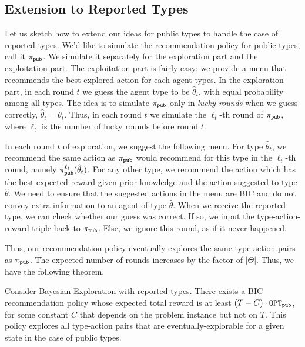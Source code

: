 
\subsection{Extension to Reported Types}
\label{sec:private_c}

\newcommand{\pipub}{\pi_{\term{pub}}}

Let us sketch how to extend our ideas for public types to handle the case of reported types. We'd like to simulate the recommendation policy for public types, call it $\pipub$. We simulate it separately for the exploration part and the exploitation part. The exploitation part is fairly easy: we provide a menu that recommends the best explored action for each agent types. In the exploration part, in each round $t$ we guess the agent type to be $\hat{\theta}_t$, with equal probability among all types. The idea is to simulate $\pipub$ only in \emph{lucky rounds} when we guess correctly, \ie $\hat{\theta}_t=\theta_t$. Thus, 
in each round $t$ we simulate the $\ell_t$-th round of $\pipub$, where $\ell_t$ is the number of lucky rounds before round $t$.

In each round $t$ of exploration, we suggest the following menu. For type $\hat{\theta}_t$, we recommend the same action as $\pipub$ would recommend for this type in the $\ell_t$-th round, namely $\pipub^{\ell_t}(\hat{\theta}_t)$.
For any other type, we recommend the action which has the best expected reward given prior knowledge and the action suggested to type $\hat{\theta}$.  We need to  ensure that the suggested actions in the menu are BIC and do not convey extra information to an agent of type $\hat{\theta}$. When we receive the reported type, we can check whether our guess was correct. If so, we input the type-action-reward triple back to $\pipub$. Else, we ignore this round, as if it never happened.

Thus, our recommendation policy eventually explores the same type-action pairs as $\pipub$. The expected number of rounds increases by the factor of $|\varTheta|$. Thus, we have the following theorem.

\begin{theorem}
\label{thm:reported}
Consider Bayesian Exploration with reported types.
There exists a BIC recommendation policy whose expected total reward is at least $\left(T - C \right) \cdot \mathtt{OPT}_{\mathtt{pub}}$, 
for some constant $C$ that depends on the problem instance but not on $T$.
This policy explores all type-action pairs that are eventually-explorable for a given state in the case of public types.
\end{theorem}

